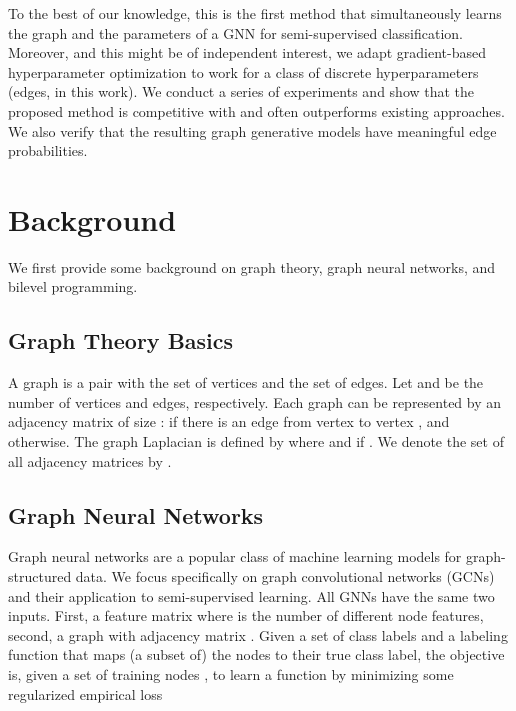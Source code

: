 \documentclass{article}
\begin{document}
To the best of our knowledge, this is the first method that simultaneously learns the graph and the parameters of a GNN for semi-supervised classification. Moreover, and this might be of independent interest, we adapt gradient-based hyperparameter optimization to work for a class of discrete hyperparameters (edges, in this work). 
We conduct a series of experiments and show that the proposed method is competitive with and often outperforms existing  approaches.  We also verify that the resulting graph generative models have meaningful edge probabilities. 








	





\section{Background}

We first provide some background on graph theory, graph neural networks, and bilevel programming.


\subsection{Graph Theory Basics}

A graph  is a pair  with  the set of vertices and  the set of edges. Let  and  be the number of vertices and edges, respectively. Each graph can be represented by an adjacency matrix  of size :  if there is an edge from vertex  to vertex 
, and  otherwise. 
The graph Laplacian is defined by  where  and  if . 
We denote the set of all  adjacency matrices by . 

\subsection{Graph Neural Networks} \label{sec:gnn:desc}

    Graph neural networks are a popular class of machine learning models for graph-structured data. We focus specifically on graph convolutional networks (GCNs) and their application to semi-supervised learning.
	All GNNs have the same two inputs. First,
	a feature matrix   where  is the number of different node features, second, a graph  with adjacency matrix . 
	Given a set of class labels  and a labeling function  
	that maps (a subset of) the nodes to their true class label, the objective is, given a set of training nodes , to learn a function
 by minimizing some regularized empirical loss 
	
\end{document}
